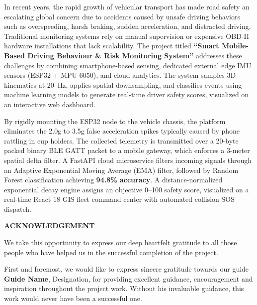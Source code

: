 \documentclass[12pt]{report}
\begin{document}
\noindent In recent years, the rapid growth of vehicular transport has made road safety an escalating global concern due to accidents caused by unsafe driving behaviors such as overspeeding, harsh braking, sudden acceleration, and distracted driving. Traditional monitoring systems rely on manual supervision or expensive OBD-II hardware installations that lack scalability. The project titled \textbf{``Smart Mobile-Based Driving Behaviour \& Risk Monitoring System''} addresses these challenges by combining smartphone-based sensing, dedicated external edge IMU sensors (ESP32 + MPU-6050), and cloud analytics. The system samples 3D kinematics at 20~Hz, applies spatial downsampling, and classifies events using machine learning models to generate real-time driver safety scores, visualized on an interactive web dashboard.

\vspace{0.4cm}
\noindent By rigidly mounting the ESP32 node to the vehicle chassis, the platform eliminates the 2.0g to 3.5g false acceleration spikes typically caused by phone rattling in cup holders. The collected telemetry is transmitted over a 20-byte packed binary BLE GATT packet to a mobile gateway, which enforces a 3-meter spatial delta filter. A FastAPI cloud microservice filters incoming signals through an Adaptive Exponential Moving Average (EMA) filter, followed by Random Forest classification achieving \textbf{94.8\% accuracy}. A distance-normalized exponential decay engine assigns an objective 0--100 safety score, visualized on a real-time React 18 GIS fleet command center with automated collision SOS dispatch.

\newpage
\thispagestyle{empty}
\begin{center}
    {\Large \textbf{ACKNOWLEDGEMENT}}\\[0.5cm]
\end{center}

\noindent We take this opportunity to express our deep heartfelt gratitude to all those people who have helped us in the successful completion of the project.

\vspace{0.3cm}
\noindent First and foremost, we would like to express sincere gratitude towards our guide \textbf{\lbrack Guide Name\rbrack}, \lbrack Designation\rbrack, for providing excellent guidance, encouragement and inspiration throughout the project work. Without his invaluable guidance, this work would never have been a successful one.
\end{document}
